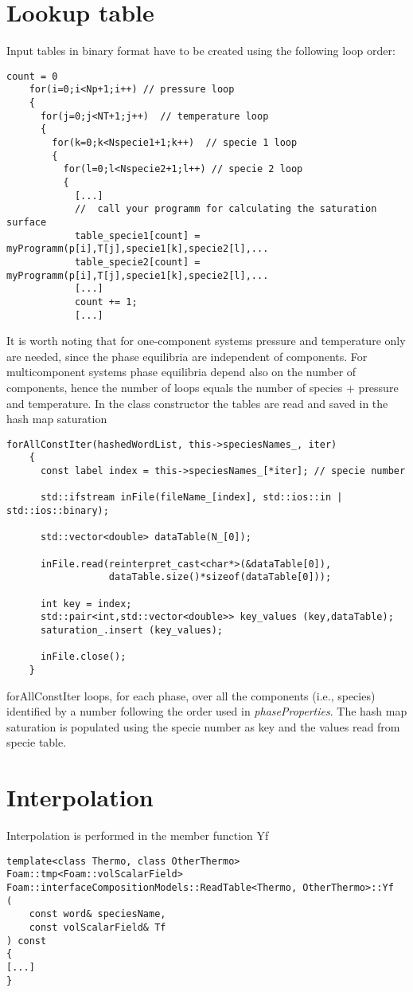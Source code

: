 \documentclass[a4paper, 12 pt, fleqn]{article}
\begin{document}
\section{Lookup table}
Input tables in binary format have to be created using the following loop order:  
\begin{lstlisting}[gobble=3]
    count = 0
    for(i=0;i<Np+1;i++) // pressure loop
    {
      for(j=0;j<NT+1;j++)  // temperature loop
      {
        for(k=0;k<Nspecie1+1;k++)  // specie 1 loop
        {
          for(l=0;l<Nspecie2+1;l++) // specie 2 loop
          {
            [...]
            //  call your programm for calculating the saturation surface
            table_specie1[count] = myProgramm(p[i],T[j],specie1[k],specie2[l],...
            table_specie2[count] = myProgramm(p[i],T[j],specie1[k],specie2[l],...
            [...]
            count += 1; 
            [...]
\end{lstlisting}
It is worth noting that for one-component systems pressure and temperature only are needed, since the phase equilibria are independent of components. For multicomponent systems phase equilibria depend also on the number of components, hence the number of loops equals the number of species + pressure and temperature. 
In the class constructor the tables are read and saved in the hash map {\ttfamily saturation}
\begin{lstlisting}[gobble=3]
    forAllConstIter(hashedWordList, this->speciesNames_, iter)
    {
      const label index = this->speciesNames_[*iter]; // specie number
       
      std::ifstream inFile(fileName_[index], std::ios::in | std::ios::binary);

      std::vector<double> dataTable(N_[0]);

      inFile.read(reinterpret_cast<char*>(&dataTable[0]), 
                  dataTable.size()*sizeof(dataTable[0]));

      int key = index;     
      std::pair<int,std::vector<double>> key_values (key,dataTable);
      saturation_.insert (key_values);

      inFile.close();  
    } 
\end{lstlisting}
{\ttfamily forAllConstIter} loops, for each phase, over all the components (i.e., species) identified by a number following the order used in \textit {phaseProperties}. The hash map {\ttfamily saturation} is populated using the specie number as key and the values read from specie table.

\section{Interpolation}
Interpolation is performed in the member function {\ttfamily Yf}
\begin{lstlisting}
template<class Thermo, class OtherThermo>
Foam::tmp<Foam::volScalarField>
Foam::interfaceCompositionModels::ReadTable<Thermo, OtherThermo>::Yf
(
    const word& speciesName,
    const volScalarField& Tf
) const
{
[...]
}
\end{lstlisting}
\end{document}
